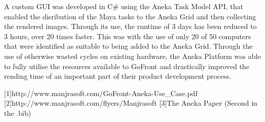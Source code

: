A custom GUI was developed in C\# using the Aneka Task Model API, that enabled the disribution of the Maya tasks to the Aneka Grid and then collecting the rendered images. Through its use, the runtime of 3 days has been reduced to 3 hours, over 20 times faster. This was with the use of only 20 of 50 computers that were identified as suitable to being added to the Aneka Grid. Through the use of otherwise wasted cycles on existing hardware, the Aneka Platform was able to fully utilise the resources available to GoFront and drastically improved the rending time of an important part of their product development process. 

[1]http://www.manjrasoft.com/GoFront-Aneka-Use\_Case.pdf
[2]http://www.manjrasoft.com/flyers/Manjrasoft%
[3]The Aneka Paper (Second in the .bib)
